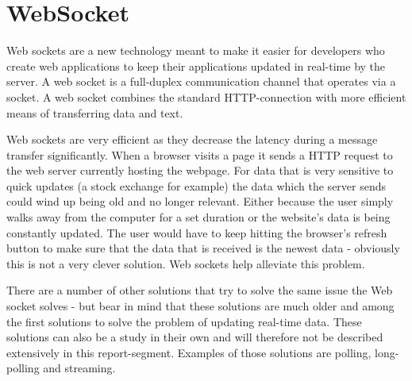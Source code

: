 \section{WebSocket}

Web sockets are a new technology meant to make it easier for developers who create web applications to keep their applications updated in real-time by the server\cite{andersen10}. A web socket is a full-duplex communication channel that operates via a socket\cite{lubbersgreco}. A web socket combines the standard HTTP-connection with more efficient means of transferring data and text\cite{lubbersgreco}.


Web sockets are very efficient as they decrease the latency during a message transfer significantly\cite{lubbersgreco}. When a browser visits a page it sends a HTTP request to the web server currently hosting the webpage\cite{lubbersgreco}. For data that is very sensitive to quick updates (a stock exchange for example) the data which the server sends could wind up being old and no longer relevant. Either because the user simply walks away from the computer for a set duration or the website's data is being constantly updated\cite{lubbersgreco}. The user would have to keep hitting the browser's refresh button to make sure that the data that is received is the newest data - obviously this is not a very clever solution\cite{lubbersgreco}. Web sockets help alleviate this problem.


There are a number of other solutions that try to solve the same issue the Web socket solves - but bear in mind that these solutions are much older and among the first solutions to solve the problem of updating real-time data\cite{lubbersgreco}. These solutions can also be a study in their own and will therefore not be described extensively in this report-segment. Examples of those solutions are polling, long-polling and streaming.






